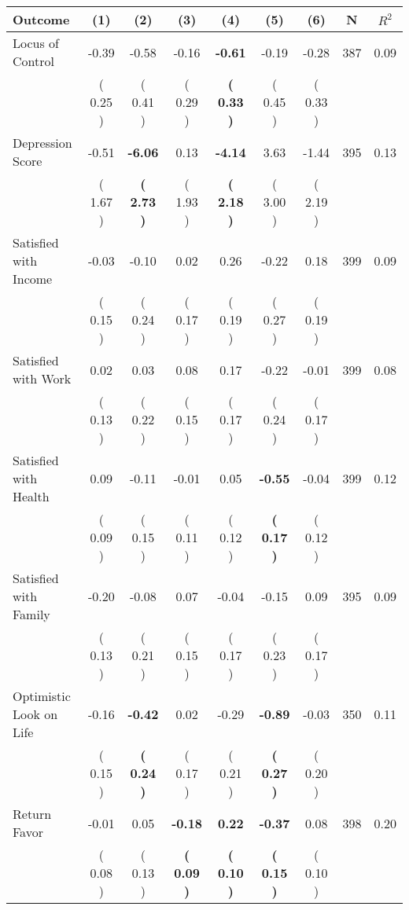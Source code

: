 \begin{tabular}{lcccccccc}
\toprule
 \textbf{Outcome} & \textbf{(1)} & \textbf{(2)} & \textbf{(3)} & \textbf{(4)} & \textbf{(5)} & \textbf{(6)} & \textbf{N} & \textbf{$ R^2$} \\
\midrule
Locus of Control &     -0.39 &     -0.58 &     -0.16 & \textbf{    -0.61} &     -0.19 &     -0.28 & 387 &       0.09 \\ 
 & (     0.25 ) & (     0.41 ) & (     0.29 ) & \textbf{(     0.33 )} & (     0.45 ) & (     0.33 ) & \\
Depression Score &     -0.51 & \textbf{    -6.06} &      0.13 & \textbf{    -4.14} &      3.63 &     -1.44 & 395 &       0.13 \\ 
 & (     1.67 ) & \textbf{(     2.73 )} & (     1.93 ) & \textbf{(     2.18 )} & (     3.00 ) & (     2.19 ) & \\
Satisfied with Income &     -0.03 &     -0.10 &      0.02 &      0.26 &     -0.22 &      0.18 & 399 &       0.09 \\ 
 & (     0.15 ) & (     0.24 ) & (     0.17 ) & (     0.19 ) & (     0.27 ) & (     0.19 ) & \\
Satisfied with Work &      0.02 &      0.03 &      0.08 &      0.17 &     -0.22 &     -0.01 & 399 &       0.08 \\ 
 & (     0.13 ) & (     0.22 ) & (     0.15 ) & (     0.17 ) & (     0.24 ) & (     0.17 ) & \\
Satisfied with Health &      0.09 &     -0.11 &     -0.01 &      0.05 & \textbf{    -0.55} &     -0.04 & 399 &       0.12 \\ 
 & (     0.09 ) & (     0.15 ) & (     0.11 ) & (     0.12 ) & \textbf{(     0.17 )} & (     0.12 ) & \\
Satisfied with Family &     -0.20 &     -0.08 &      0.07 &     -0.04 &     -0.15 &      0.09 & 395 &       0.09 \\ 
 & (     0.13 ) & (     0.21 ) & (     0.15 ) & (     0.17 ) & (     0.23 ) & (     0.17 ) & \\
Optimistic Look on Life &     -0.16 & \textbf{    -0.42} &      0.02 &     -0.29 & \textbf{    -0.89} &     -0.03 & 350 &       0.11 \\ 
 & (     0.15 ) & \textbf{(     0.24 )} & (     0.17 ) & (     0.21 ) & \textbf{(     0.27 )} & (     0.20 ) & \\
Return Favor &     -0.01 &      0.05 & \textbf{    -0.18} & \textbf{     0.22} & \textbf{    -0.37} &      0.08 & 398 &       0.20 \\ 
 & (     0.08 ) & (     0.13 ) & \textbf{(     0.09 )} & \textbf{(     0.10 )} & \textbf{(     0.15 )} & (     0.10 ) & \\

\end{tabular}

